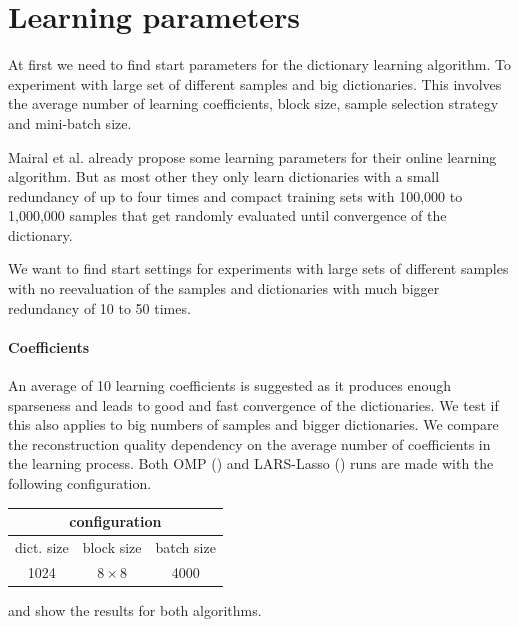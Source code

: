 \section{Learning parameters}
At first we need to find start parameters for the dictionary learning
algorithm. To experiment with large set of different samples and big
dictionaries. This involves the average number of learning
coefficients, block size, sample selection strategy and mini-batch size.

Mairal et al. already propose some learning parameters for their online
learning algorithm. But as most other they only learn dictionaries with
a small redundancy of up to four times and compact training sets with 100,000
to 1,000,000 samples that get randomly evaluated until convergence of the
dictionary.

We want to find start settings for experiments with large sets of
different samples with no reevaluation of the samples and dictionaries
with much bigger redundancy of 10 to 50 times.

\paragraph{Coefficients}
An average of 10 learning coefficients is suggested as it produces enough
sparseness and leads to good and fast convergence of the dictionaries.
We test if this also applies to big numbers of samples and bigger
dictionaries. We compare the reconstruction quality dependency on the average
number of coefficients in the learning process. 
Both OMP () and LARS-Lasso
() runs are made with the following
configuration.
\begin{table}[H]
\centering
\begin{tabular}{| c | c | c |}
\hline
\multicolumn{3}{|c|}{configuration}\\
\hline
dict. size & block size & batch size \\
\hline
1024 & $8\times 8$ & 4000  \\
\hline
\end{tabular}
\end{table}

 and  show the results for
both algorithms.

